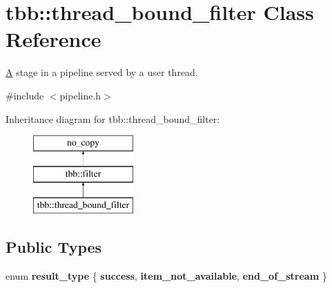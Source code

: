 \hypertarget{classtbb_1_1thread__bound__filter}{}\section{tbb\+:\+:thread\+\_\+bound\+\_\+filter Class Reference}
\label{classtbb_1_1thread__bound__filter}


\hyperlink{structA}{A} stage in a pipeline served by a user thread.  




{\ttfamily \#include $<$pipeline.\+h$>$}

Inheritance diagram for tbb\+:\+:thread\+\_\+bound\+\_\+filter\+:\begin{figure}[H]
\begin{center}
\leavevmode
\includegraphics[height=3.000000cm]{classtbb_1_1thread__bound__filter}
\end{center}
\end{figure}
\subsection*{Public Types}
\begin{DoxyCompactItemize}
\item 
\hypertarget{classtbb_1_1thread__bound__filter_a2425d6944a22a57c906945df57290e9d}{}enum {\bfseries result\+\_\+type} \{ {\bfseries success}, 
{\bfseries item\+\_\+not\+\_\+available}, 
{\bfseries end\+\_\+of\+\_\+stream}
 \}\label{classtbb_1_1thread__bound__filter_a2425d6944a22a57c906945df57290e9d}

\end{DoxyCompactItemize}
